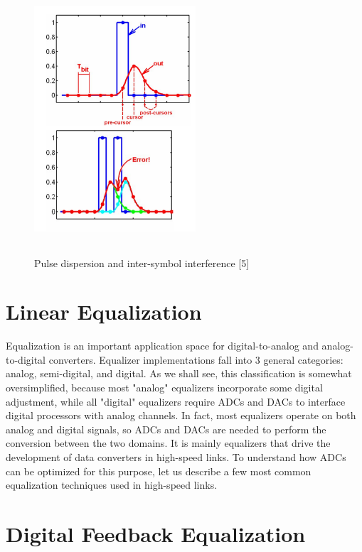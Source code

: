 \begin{figure}[h]
	\centering
	\includegraphics[width=6cm,height=10cm]{fig2_2.png}
	\caption{Pulse dispersion and inter-symbol interference [5]}
	\label{ISI}
\end{figure}

\section{Linear Equalization}
Equalization is an important application space for digital-to-analog and 
analog-to-digital converters. Equalizer implementations fall into 3 general categories: 
analog, semi-digital, and digital. As we shall see, this classification is somewhat 
oversimplified, because most "analog" equalizers incorporate some digital adjustment, 
while all "digital" equalizers require ADCs and DACs to interface digital processors with analog channels. In fact, most equalizers operate on both analog and digital 
signals, so ADCs and DACs are needed to perform the conversion between the two 
domains. It is mainly equalizers that drive the development of data converters in high-speed links. To understand how ADCs can be optimized for this purpose, let us 
describe a few most common equalization techniques used in high-speed links.

\section{Digital Feedback Equalization}

